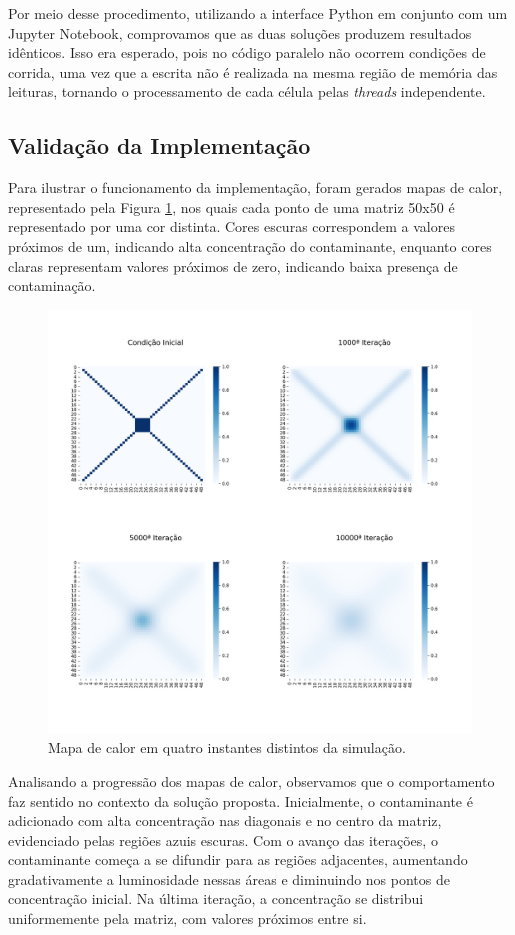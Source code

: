 \documentclass[12pt]{article}
\begin{document}
Por meio desse procedimento, utilizando a interface Python em conjunto com um Jupyter Notebook, comprovamos que as duas soluções produzem resultados idênticos. Isso era esperado, pois no código paralelo não ocorrem condições de corrida, uma vez que a escrita não é realizada na mesma região de memória das leituras, tornando o processamento de cada célula pelas \textit{threads} independente.

\subsection{Validação da Implementação}

Para ilustrar o funcionamento da implementação, foram gerados mapas de calor, representado pela Figura \ref{fig:heatmap}, nos quais cada ponto de uma matriz 50x50 é representado por uma cor distinta. Cores escuras correspondem a valores próximos de um, indicando alta concentração do contaminante, enquanto cores claras representam valores próximos de zero, indicando baixa presença de contaminação.

\begin{figure}[ht]
\centering
\includegraphics[width=.7\textwidth]{figs/heatmap.png}
\caption{Mapa de calor em quatro instantes distintos da simulação.}
\label{fig:heatmap}
\end{figure}

Analisando a progressão dos mapas de calor, observamos que o comportamento faz sentido no contexto da solução proposta. Inicialmente, o contaminante é adicionado com alta concentração nas diagonais e no centro da matriz, evidenciado pelas regiões azuis escuras. Com o avanço das iterações, o contaminante começa a se difundir para as regiões adjacentes, aumentando gradativamente a luminosidade nessas áreas e diminuindo nos pontos de concentração inicial. Na última iteração, a concentração se distribui uniformemente pela matriz, com valores próximos entre si.
\end{document}
